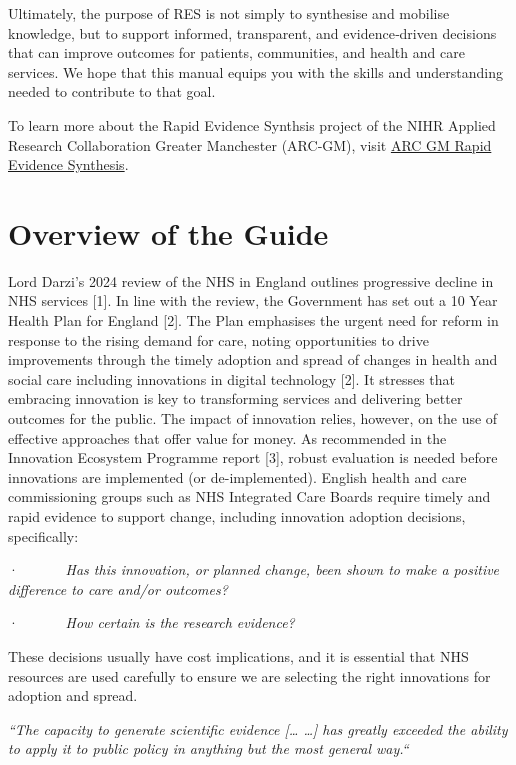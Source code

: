\documentclass[
  letterpaper,
  DIV=11,
  numbers=noendperiod]{scrreprt}
\begin{document}
Ultimately, the purpose of RES is not simply to synthesise and mobilise
knowledge, but to support informed, transparent, and evidence‑driven
decisions that can improve outcomes for patients, communities, and
health and care services. We hope that this manual equips you with the
skills and understanding needed to contribute to that goal.

To learn more about the Rapid Evidence Synthsis project of the NIHR
Applied Research Collaboration Greater Manchester (ARC‑GM), visit
\href{https://arc-gm.nihr.ac.uk/rapid-evidence-synthesis}{ARC GM
\textbar{} Rapid Evidence Synthesis}.


\chapter{Overview of the Guide}\label{overview-of-the-guide}

Lord Darzi's 2024 review of the NHS in England outlines progressive
decline in NHS services {[}1{]}. In line with the review, the Government
has set out a 10 Year Health Plan for England {[}2{]}. The Plan
emphasises the urgent need for reform in response to the rising demand
for care, noting opportunities to drive improvements through the timely
adoption and spread of changes in health and social care including
innovations in digital technology {[}2{]}. It stresses that embracing
innovation is key to transforming services and delivering better
outcomes for the public. The impact of innovation relies, however, on
the use of effective approaches that offer value for money. As
recommended in the Innovation Ecosystem Programme report {[}3{]}, robust
evaluation is needed before innovations are implemented (or
de-implemented). English health and care commissioning groups such as
NHS Integrated Care Boards require timely and rapid evidence to support
change, including innovation adoption decisions, specifically:

·~~~~~~ \emph{Has this innovation, or planned change, been shown to make
a positive difference to care and/or outcomes?}

·~~~~~~ \emph{How certain is the research evidence?}

These decisions usually have cost implications, and it is essential that
NHS resources are used carefully to ensure we are selecting the right
innovations for adoption and spread.

\emph{``The capacity to generate scientific evidence {[}\ldots{}
\ldots{]} has greatly exceeded the ability to apply it to public policy
in anything but the most general way.``}
\end{document}
